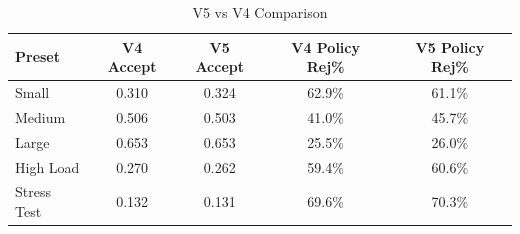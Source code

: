 \begin{table}[h]
\centering
\caption{V5 vs V4 Comparison}
\label{tab:comparison}
\begin{tabular}{lcccc}
\toprule
Preset & V4 Accept & V5 Accept & V4 Policy Rej\% & V5 Policy Rej\% \\
\midrule
Small & 0.310 & 0.324 & 62.9\% & 61.1\% \\
Medium & 0.506 & 0.503 & 41.0\% & 45.7\% \\
Large & 0.653 & 0.653 & 25.5\% & 26.0\% \\
High Load & 0.270 & 0.262 & 59.4\% & 60.6\% \\
Stress Test & 0.132 & 0.131 & 69.6\% & 70.3\% \\
\bottomrule
\end{tabular}
\end{table}

